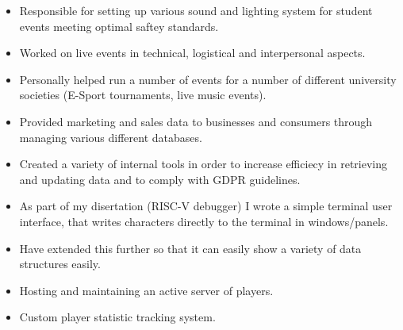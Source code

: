 \documentclass[10pt,a4paper,ragged2e,withhyper]{altacv}
\begin{document}
\divider

\begin{itemize}
	\item Responsible for setting up various sound and lighting system for student events meeting optimal saftey standards.
	\item Worked on live events in technical, logistical and interpersonal aspects.
	\item Personally helped run a number of events for a number of different university societies (E-Sport tournaments, live music events).
\end{itemize}

\divider

\begin{itemize}
	\item Provided marketing and sales data to businesses and consumers through managing various different databases.
	\item Created a variety of internal tools in order to increase efficiecy in retrieving and updating data and to comply with GDPR guidelines.
\end{itemize}


\begin{itemize}
	\item As part of my disertation (RISC-V debugger) I wrote a simple terminal user interface, that writes characters directly to the terminal in windows/panels.
	\item Have extended this further so that it can easily show a variety of data structures easily.
\end{itemize}

\divider

\begin{itemize}
        \item Hosting and maintaining an active server of players.
        \item Custom player statistic tracking system.
\end{itemize}
\divider
\end{document}
